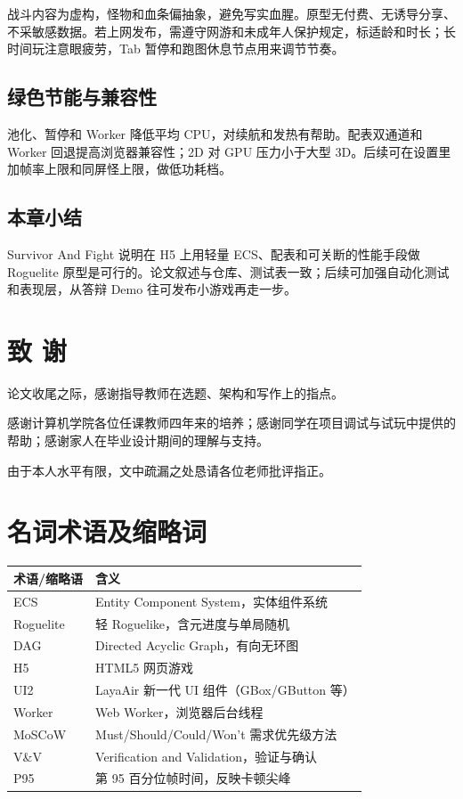 \documentclass[UTF8,a4paper]{ctexart}
\begin{document}
战斗内容为虚构，怪物和血条偏抽象，避免写实血腥。原型无付费、无诱导分享、不采敏感数据。若上网发布，需遵守网游和未成年人保护规定，标适龄和时长；长时间玩注意眼疲劳，Tab 暂停和跑图休息节点用来调节节奏\cite{petty2010vv}。

\section{绿色节能与兼容性}

池化、暂停和 Worker 降低平均 CPU，对续航和发热有帮助\cite{gregory2018game}。配表双通道和 Worker 回退提高浏览器兼容性；2D 对 GPU 压力小于大型 3D。后续可在设置里加帧率上限和同屏怪上限，做低功耗档。

\section{本章小结}

Survivor And Fight 说明在 H5 上用轻量 ECS、配表和可关断的性能手段做 Roguelite 原型是可行的。论文叙述与仓库、测试表一致；后续可加强自动化测试和表现层，从答辩 Demo 往可发布小游戏再走一步。

\chapter*{致  谢}


论文收尾之际，感谢指导教师在选题、架构和写作上的指点。

感谢计算机学院各位任课教师四年来的培养；感谢同学在项目调试与试玩中提供的帮助；感谢家人在毕业设计期间的理解与支持。

由于本人水平有限，文中疏漏之处恳请各位老师批评指正。

\chapter{名词术语及缩略词}
\label{app:terms}

\begin{longtable}{ll}
  \toprule
  \textbf{术语/缩略语} & \textbf{含义} \\
  \midrule
  ECS & Entity Component System，实体组件系统 \\
  Roguelite & 轻 Roguelike，含元进度与单局随机 \\
  DAG & Directed Acyclic Graph，有向无环图 \\
  H5 & HTML5 网页游戏 \\
  UI2 & LayaAir 新一代 UI 组件（GBox/GButton 等） \\
  Worker & Web Worker，浏览器后台线程 \\
  MoSCoW & Must/Should/Could/Won't 需求优先级方法 \\
  V\&V & Verification and Validation，验证与确认 \\
  P95 & 第 95 百分位帧时间，反映卡顿尖峰 \\
  \bottomrule
\end{longtable}
\end{document}
